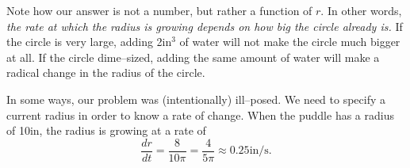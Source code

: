 {\begin{enumerate}
Note how our answer is not a number, but rather a function of $r$. In other words, \textit{the rate at which the radius is growing depends on how big the circle already is.} If the circle is very large, adding 2in$^3$ of water will not make the circle much bigger at all. If the circle dime--sized, adding the same amount of water will make a radical change in the radius of the circle.

In some ways, our problem was (intentionally) ill--posed. We need to specify a current radius in order to know a rate of change. When the puddle has a radius of 10in, the radius is growing at a rate of $$
\frac{dr}{dt} = \frac{8}{10\pi} = \frac{4}{5\pi} \approx 0.25\text{in/s}.$$
 
\end{enumerate}
\baselineskip
}\\

